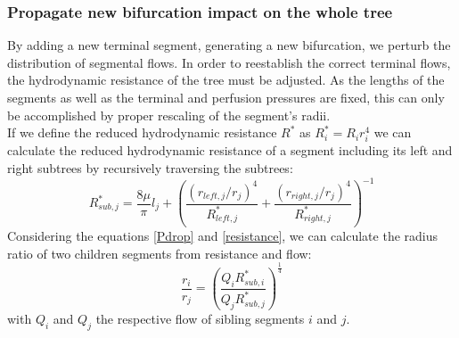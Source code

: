\documentclass[a4paper, 11pt]{article} %
\begin{document}
%
%

\subsubsection{Propagate new bifurcation impact on the whole tree}
\label{propagate}
By adding a new terminal segment, generating a new bifurcation, we perturb the distribution of segmental flows. In order to reestablish the correct terminal flows, the hydrodynamic resistance of the tree must be adjusted. As the lengths of the segments as well as the terminal and perfusion pressures are fixed, this can only be accomplished by proper rescaling of the segment's radii.\\

If we define the reduced hydrodynamic resistance $R^*$ as $R^*_i = R_i r_i^4$ we can calculate the reduced hydrodynamic resistance of a segment including its left and right subtrees by recursively traversing the subtrees:
\begin{equation} \label{red resistance}
R^*_{sub,j} = \frac{8\mu}{\pi}l_j + \left( \frac{(r_{left,j}/r_j)^4}{R_{left,j}^*} + \frac{(r_{right,j}/r_j)^4}{R_{right,j}^*}\right)^{-1}
\end{equation}
Considering the equations \eqref{Pdrop} and \eqref{resistance}, we can calculate the radius ratio of two children segments from resistance and flow:
\begin{equation} \label{children ratio}
\frac{r_i}{r_j} = \left(\frac{Q_iR_{sub,i}^*}{Q_jR_{sub,j}^*}\right)^\frac{1}{4}
\end{equation}
with $Q_i$ and $Q_j$ the respective flow of sibling segments $i$ and $j$.
\end{document}
